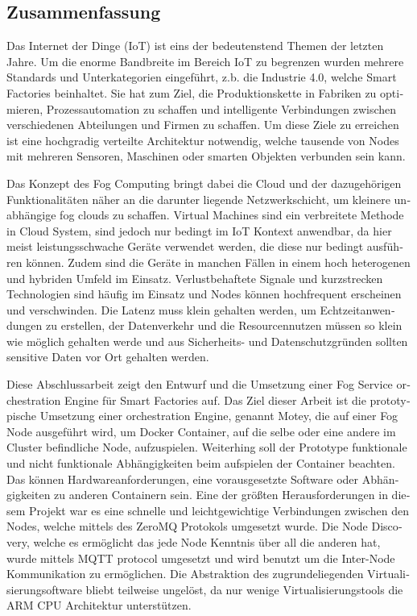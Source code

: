 \begin{otherlanguage}{ngerman}
\chapter*{Zusammenfassung}\label{chapter:zusammenfassung}
Das Internet der Dinge (\acs{IoT}) ist eins der bedeutenstend Themen der letzten Jahre.
Um die enorme Bandbreite im Bereich \acs{IoT} zu begrenzen wurden mehrere Standards und Unterkategorien eingeführt, z.b. die Industrie 4.0, welche Smart Factories beinhaltet.
Sie hat zum Ziel, die Produktionskette in Fabriken zu optimieren, Prozessautomation zu schaffen und intelligente Verbindungen zwischen verschiedenen Abteilungen und Firmen zu schaffen.
Um diese Ziele zu erreichen ist eine hochgradig verteilte Architektur notwendig, welche tausende von Nodes mit mehreren Sensoren, Maschinen oder smarten Objekten verbunden sein kann.

Das Konzept des Fog Computing bringt dabei die Cloud und der dazugehörigen Funktionalitäten näher an die darunter liegende Netzwerkschicht, um kleinere unabhängige fog clouds zu schaffen.
Virtual Machines sind ein verbreitete Methode in Cloud System, sind jedoch nur bedingt im \ac{IoT} Kontext anwendbar, da hier meist leistungsschwache Geräte verwendet werden, die diese nur bedingt ausführen können.
Zudem sind die Geräte in manchen Fällen in einem hoch heterogenen und hybriden Umfeld im Einsatz.
Verlustbehaftete Signale und kurzstrecken Technologien sind häufig im Einsatz und Nodes können hochfrequent erscheinen und verschwinden.
Die Latenz muss klein gehalten werden, um Echtzeitanwendungen zu erstellen, der Datenverkehr und die Resourcennutzen müssen so klein wie möglich gehalten werde und aus Sicherheits- und Datenschutzgründen sollten sensitive Daten vor Ort gehalten werden.

Diese Abschlussarbeit zeigt den Entwurf und die Umsetzung einer Fog Service orchestration Engine für Smart Factories auf.
Das Ziel dieser Arbeit ist die prototypische Umsetzung einer orchestration Engine, genannt Motey, die auf einer Fog Node ausgeführt wird, um Docker Container, auf die selbe oder eine andere im Cluster befindliche Node, aufzuspielen.
Weiterhing soll der Prototype funktionale und nicht funktionale Abhängigkeiten beim aufspielen der Container beachten.
Das können Hardwareanforderungen, eine vorausgesetzte Software oder Abhängigkeiten zu anderen Containern sein.
Eine der größten Herausforderungen in diesem Projekt war es eine schnelle und leichtgewichtige Verbindungen zwischen den Nodes, welche mittels des ZeroMQ Protokols umgesetzt wurde.
Die Node Discovery, welche es ermöglicht das jede Node Kenntnis über all die anderen hat, wurde mittels \acs{MQTT} protocol umgesetzt und wird benutzt um die Inter-Node Kommunikation zu ermöglichen.
Die Abstraktion des zugrundeliegenden Virtualisierungsoftware bliebt teilweise ungelöst, da nur wenige Virtualisierungstools die ARM \acs{CPU} Architektur unterstützen.


\end{otherlanguage}
